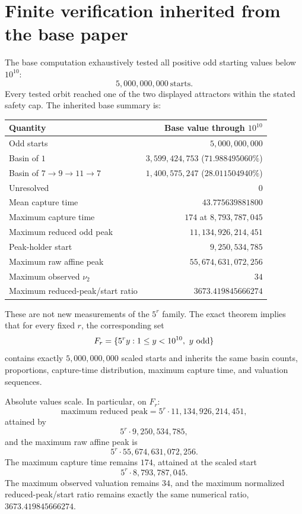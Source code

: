 \documentclass[11pt]{article}
\theoremstyle{remark}
\newcommand{\vTwo}{\nu_2}
\begin{document}
\section{Finite verification inherited from the base paper}

The base computation exhaustively tested all positive odd starting values below $10^{10}$:
\[
5,000,000,000\ \text{starts}.
\]
Every tested orbit reached one of the two displayed attractors within the stated safety cap.  The inherited base summary is:
\begin{center}
\begin{tabular}{@{}lr@{}}
\toprule
Quantity & Base value through $10^{10}$\\
\midrule
Odd starts & $5,000,000,000$\\
Basin of $1$ & $3,599,424,753$ ($71.988495060\%$)\\
Basin of $7\to9\to11\to7$ & $1,400,575,247$ ($28.011504940\%$)\\
Unresolved & $0$\\
Mean capture time & $43.775639881800$\\
Maximum capture time & $174$ at $8,793,787,045$\\
Maximum reduced odd peak & $11,134,926,214,451$\\
Peak-holder start & $9,250,534,785$\\
Maximum raw affine peak & $55,674,631,072,256$\\
Maximum observed $\vTwo$ & $34$\\
Maximum reduced-peak/start ratio & $3673.419845666274$\\
\bottomrule
\end{tabular}
\end{center}

These are not new measurements of the $5^r$ family.  The exact theorem implies that for every fixed $r$, the corresponding set
\begin{equation}
F_r=\{5^ry:1\le y<10^{10},\ y\ {\rm odd}\}
\label{eq:finitefamily}
\end{equation}
contains exactly $5,000,000,000$ scaled starts and inherits the same basin counts, proportions, capture-time distribution, maximum capture time, and valuation sequences.

Absolute values scale.  In particular, on $F_r$:
\[
\text{maximum reduced peak}
=
5^r\cdot11,134,926,214,451,
\]
attained by
\[
5^r\cdot9,250,534,785,
\]
and the maximum raw affine peak is
\[
5^r\cdot55,674,631,072,256.
\]
The maximum capture time remains $174$, attained at the scaled start
\[
5^r\cdot8,793,787,045.
\]
The maximum observed valuation remains $34$, and the maximum normalized reduced-peak/start ratio remains exactly the same numerical ratio, $3673.419845666274$.
\end{document}
